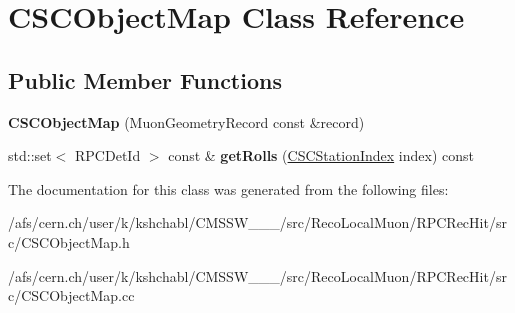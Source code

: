 \hypertarget{classCSCObjectMap}{\section{C\-S\-C\-Object\-Map Class Reference}
\label{classCSCObjectMap}
}
\subsection*{Public Member Functions}
\begin{DoxyCompactItemize}
\item 
\hypertarget{classCSCObjectMap_a675ca7b98ff7b3d6654f3b0cf60b7296}{{\bfseries C\-S\-C\-Object\-Map} (Muon\-Geometry\-Record const \&record)}\label{classCSCObjectMap_a675ca7b98ff7b3d6654f3b0cf60b7296}

\item 
\hypertarget{classCSCObjectMap_a0e2bcb7feb4ac1845518a7467a68c2fb}{std\-::set$<$ R\-P\-C\-Det\-Id $>$ const \& {\bfseries get\-Rolls} (\hyperlink{classCSCStationIndex}{C\-S\-C\-Station\-Index} index) const }\label{classCSCObjectMap_a0e2bcb7feb4ac1845518a7467a68c2fb}

\end{DoxyCompactItemize}


The documentation for this class was generated from the following files\-:\begin{DoxyCompactItemize}
\item 
/afs/cern.\-ch/user/k/kshchabl/\-C\-M\-S\-S\-W\-\_\-\_\-\_/src/\-Reco\-Local\-Muon/\-R\-P\-C\-Rec\-Hit/src/C\-S\-C\-Object\-Map.\-h\item 
/afs/cern.\-ch/user/k/kshchabl/\-C\-M\-S\-S\-W\-\_\-\_\-\_/src/\-Reco\-Local\-Muon/\-R\-P\-C\-Rec\-Hit/src/C\-S\-C\-Object\-Map.\-cc\end{DoxyCompactItemize}
